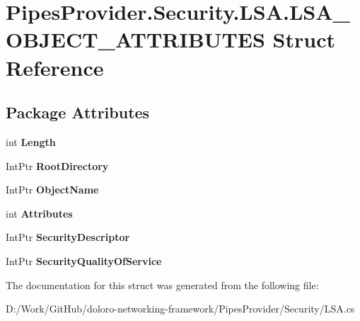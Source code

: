 \hypertarget{struct_pipes_provider_1_1_security_1_1_l_s_a_1_1_l_s_a___o_b_j_e_c_t___a_t_t_r_i_b_u_t_e_s}{}\section{Pipes\+Provider.\+Security.\+L\+S\+A.\+L\+S\+A\+\_\+\+O\+B\+J\+E\+C\+T\+\_\+\+A\+T\+T\+R\+I\+B\+U\+T\+ES Struct Reference}
\label{struct_pipes_provider_1_1_security_1_1_l_s_a_1_1_l_s_a___o_b_j_e_c_t___a_t_t_r_i_b_u_t_e_s}
\subsection*{Package Attributes}
\begin{DoxyCompactItemize}
\item 
\mbox{\label{struct_pipes_provider_1_1_security_1_1_l_s_a_1_1_l_s_a___o_b_j_e_c_t___a_t_t_r_i_b_u_t_e_s_a47b2267f43c5ea4789053114b8a13f00}} 
int {\bfseries Length}
\item 
\mbox{\label{struct_pipes_provider_1_1_security_1_1_l_s_a_1_1_l_s_a___o_b_j_e_c_t___a_t_t_r_i_b_u_t_e_s_a66b8ed917286d00eea70c66ca2af6d0a}} 
Int\+Ptr {\bfseries Root\+Directory}
\item 
\mbox{\label{struct_pipes_provider_1_1_security_1_1_l_s_a_1_1_l_s_a___o_b_j_e_c_t___a_t_t_r_i_b_u_t_e_s_a78f427087b120de8a84afb5dddfc9e75}} 
Int\+Ptr {\bfseries Object\+Name}
\item 
\mbox{\label{struct_pipes_provider_1_1_security_1_1_l_s_a_1_1_l_s_a___o_b_j_e_c_t___a_t_t_r_i_b_u_t_e_s_a7fb617bb90a83f5e040bd91eeafa495b}} 
int {\bfseries Attributes}
\item 
\mbox{\label{struct_pipes_provider_1_1_security_1_1_l_s_a_1_1_l_s_a___o_b_j_e_c_t___a_t_t_r_i_b_u_t_e_s_a85b08b22b2105c4ccf9e73cf6b81fffb}} 
Int\+Ptr {\bfseries Security\+Descriptor}
\item 
\mbox{\label{struct_pipes_provider_1_1_security_1_1_l_s_a_1_1_l_s_a___o_b_j_e_c_t___a_t_t_r_i_b_u_t_e_s_a400ac67d06ed0dd89da96185b233a981}} 
Int\+Ptr {\bfseries Security\+Quality\+Of\+Service}
\end{DoxyCompactItemize}


The documentation for this struct was generated from the following file\+:\begin{DoxyCompactItemize}
\item 
D\+:/\+Work/\+Git\+Hub/doloro-\/networking-\/framework/\+Pipes\+Provider/\+Security/L\+S\+A.\+cs\end{DoxyCompactItemize}
